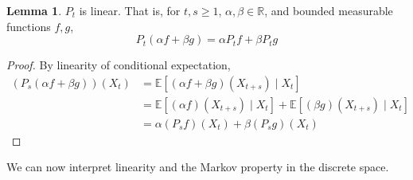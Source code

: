 \documentclass{article}
\theoremstyle{definition}
\newtheorem{lemma}[theorem]{Lemma}
\theoremstyle{remark}
\theoremstyle{definition}
\begin{document}
\begin{lemma}
$P_t$ is linear. That is, for $t, s \geq 1$, $\alpha, \beta \in \mathbb{R}$, and bounded measurable functions $f, g$, 
\[P_t (\alpha f + \beta g) = \alpha P_t f + \beta P_t g\] 
\end{lemma}
\begin{proof}
By linearity of conditional expectation, 
\begin{align*}
    (P_s (\alpha f + \beta g))(X_t) & = \mathbb{E}[(\alpha f + \beta g)(X_{t + s}) \mid X_t] \\
    & = \mathbb{E}[(\alpha f) (X_{t + s}) \mid X_t] + \mathbb{E}[(\beta g) (X_{t + s}) \mid X_t] \\
    & = \alpha (P_s f) (X_t) + \beta (P_s g) (X_t)
\end{align*}
\end{proof}

We can now interpret linearity and the Markov property in the discrete space. 
\end{document}
